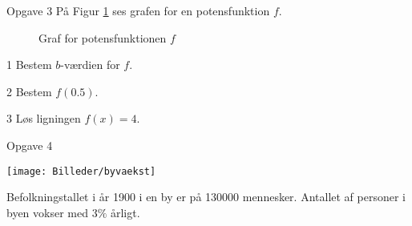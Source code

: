 \newpage
\begin{opgavetekst}{Opgave 3}
	På Figur \ref{fig:potensgraf} ses grafen for en potensfunktion $f$.
	\begin{figure}[H]
		\centering
		\caption{Graf for potensfunktionen $f$}
		\label{fig:potensgraf}
	\end{figure}
	\phantom{h}
\end{opgavetekst}
\begin{delopgave}{}{1}
	Bestem $b$-værdien for $f$.
\end{delopgave}
\begin{delopgave}{}{2}
	Bestem $f(0.5)$.
\end{delopgave}
\begin{delopgave}{}{3}
	Løs ligningen $f(x) = 4$.
\end{delopgave}
\begin{opgavetekst}{Opgave 4}
	\begin{center}
		\texttt{[image: Billeder/byvaekst]}
	\end{center}
	Befolkningstallet i år 1900 i en by er på 130000 mennesker. Antallet af personer i byen vokser med 3$\%$ årligt.
\end{opgavetekst}
